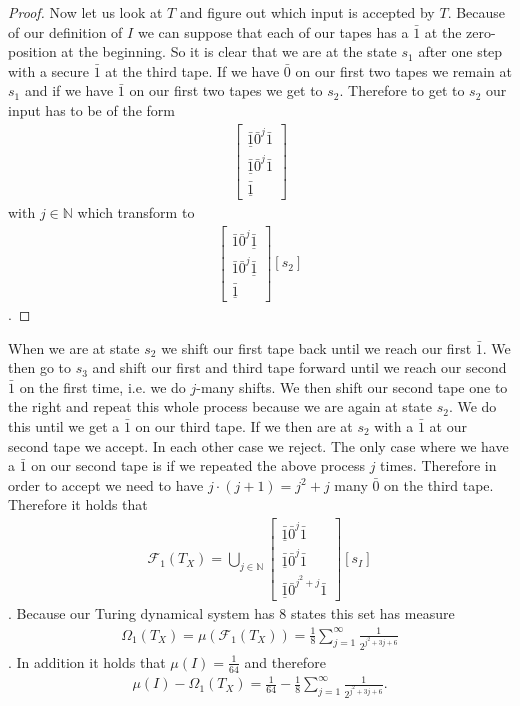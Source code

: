 \documentclass[12pt,a4paper]{scrartcl}
\theoremstyle{plain}
\theoremstyle{definition}
\numberwithin{equation}{section}
\newcommand{\N}{\mathbb{N}} %
\newcommand{\2}{\mathbb{Z} / 2 \mathbb{Z}}
\newcommand{\1}{\bar{1}}
\newcommand{\0}{\bar{0}}
\begin{document}
\begin{proof}
	Now let us look at $T$ and figure out which input is accepted by $T$. Because of our definition of $I$ we can suppose that each of our tapes has a $\1$ at the zero-position at the beginning. So it is clear that we are at the state $s_1$ after one step with a secure $\1$ at the third tape. If we have $\0$ on our first two tapes we remain at $s_1$ and if we have $\1$ on our first two tapes we get to $s_2$. Therefore to get to $s_2$ our input has to be of the form 
	\begin{align*}
		\begin{bmatrix}
			\underline{\1} \0^j \1 \\
			\underline{\1} \0^j \1 \\
			\underline{\1} 
		\end{bmatrix}
	\end{align*}
	with $j \in \N$ which transform to
	\begin{align*}
	\begin{bmatrix}
	\1 \0^j \underline{\1}  \\
	\1 \0^j \underline{\1}  \\
	\underline{\1} 
	\end{bmatrix}[s_2]
	\end{align*}.
\end{proof}
When we are at state $s_2$ we shift our first tape back until we reach our first $\1$. We then go to $s_3$ and shift our first and third tape forward until we reach our second $\1$ on the first time, i.e. we do $j$-many shifts. We then shift our second tape one to the right and repeat this whole process because we are again at state $s_2$. We do this until we get a $\1$ on our third tape. If we then are at $s_2$ with a $\1$ at our second tape we accept. In each other case we reject. The only case where we have a $\1$ on our second tape is if we repeated the above process $j$ times. Therefore in order to accept we need to have $j \cdot (j + 1) = j^2 + j$  many $\0$ on the third tape. Therefore it holds that
\begin{align*}
	\mathcal{F}_1(T_X) = \bigcup_{j \in \N}\begin{bmatrix}
	 	\underline{\1} \0^j \1 \\
	 	\underline{\1} \0^j \1 \\
	 	\underline{\1} \0^{j^2 + j} \1
	\end{bmatrix}[s_I]
\end{align*}. 
Because our Turing dynamical system  has $8$ states this set has measure 
\begin{align*}
	\Omega_1(T_X) = \mu(\mathcal{F}_1(T_X)) = \frac{1}{8} \sum_{j = 1}^{\infty} \frac{1}{2^{j^2 + 3j + 6}}
\end{align*}.
In addition it holds that $\mu (I) = \frac{1}{64}$ and therefore 
\begin{align*}
	\mu (I) - \Omega_1(T_X) = \frac{1}{64} - \frac{1}{8} \sum_{j = 1}^{\infty} \frac{1}{2^{j^2 + 3j + 6}}.
\end{align*}
\end{document}
